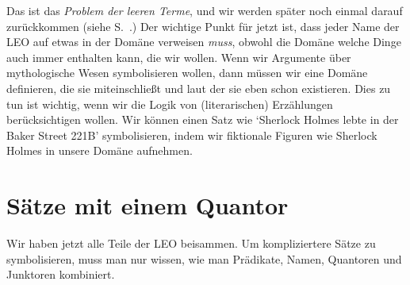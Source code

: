 Das ist das \emph{Problem der leeren Terme}, und wir werden später noch einmal darauf zurückkommen (siehe S.~\pageref{subsec.defdesc}.) Der wichtige Punkt für jetzt ist, dass jeder Name der LEO auf etwas in der Domäne verweisen \emph{muss}, obwohl die Domäne welche Dinge auch immer enthalten kann, die wir wollen. Wenn wir Argumente über mythologische Wesen symbolisieren wollen, dann müssen wir eine Domäne definieren, die sie miteinschlie{\ss}t und laut der sie eben schon existieren. Dies zu tun ist wichtig, wenn wir die Logik von (literarischen) Erzählungen berücksichtigen wollen. Wir können einen Satz wie `Sherlock Holmes lebte in der Baker Street 221B' symbolisieren, indem wir fiktionale Figuren wie Sherlock Holmes in unsere Domäne aufnehmen.

\chapter{Sätze mit einem Quantor}
\label{s:MoreMonadic}

Wir haben jetzt alle Teile der LEO beisammen. Um kompliziertere Sätze zu symbolisieren, muss man nur wissen, wie man Prädikate, Namen, Quantoren und Junktoren kombiniert. 

